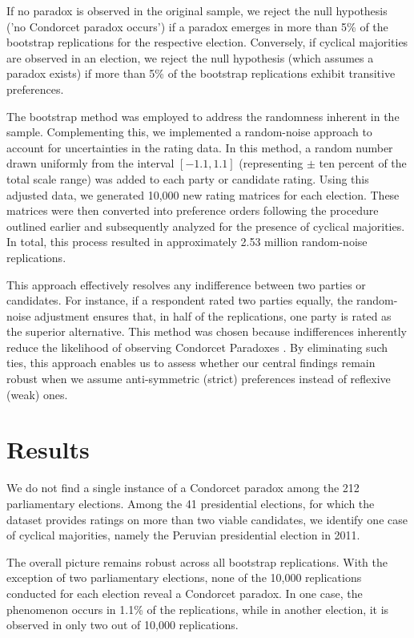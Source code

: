 \documentclass[12pt]{scrartcl}
\newcommand{\nbparliament}{212 }
\newcommand{\nbpresidential}{41 }
\begin{document}
If no paradox is observed in the original sample, we reject the null hypothesis ('no Condorcet paradox occurs') if a paradox emerges in more than 5\% of the bootstrap replications for the respective election. Conversely, if cyclical majorities are observed in an election, we reject the null hypothesis (which assumes a paradox exists) if more than 5\% of the bootstrap replications exhibit transitive preferences. 

The bootstrap method was employed to address the randomness inherent in the sample. Complementing this, we implemented a random-noise approach to account for uncertainties in the rating data. In this method, a random number drawn uniformly from the interval $[-1.1, 1.1]$ (representing $\pm$ ten percent of the total scale range) was added to each party or candidate rating. Using this adjusted data, we generated 10,000 new rating matrices for each election. These matrices were then converted into preference orders following the procedure outlined earlier and subsequently analyzed for the presence of cyclical majorities. In total, this process resulted in approximately 2.53 million random-noise replications.

This approach effectively resolves any indifference between two parties or candidates. For instance, if a respondent rated two parties equally, the random-noise adjustment ensures that, in half of the replications, one party is rated as the superior alternative. This method was chosen because indifferences inherently reduce the likelihood of observing Condorcet Paradoxes \citep{Lepelley2001}. By eliminating such ties, this approach enables us to assess whether our central findings remain robust when we assume anti-symmetric (strict) preferences instead of reflexive (weak) ones.

\section{Results} \label{sec.results}
We do not find a single instance of a Condorcet paradox among the \nbparliament parliamentary elections. Among the \nbpresidential presidential elections, for which the dataset provides ratings on more than two viable candidates, we identify one case of cyclical majorities, namely the Peruvian presidential election in 2011. 

The overall picture remains robust across all bootstrap replications. With the exception of two parliamentary elections, none of the 10,000 replications conducted for each election reveal a Condorcet paradox. In one case, the phenomenon occurs in 1.1\% of the replications, while in another election, it is observed in only two out of 10,000 replications.
\end{document}
